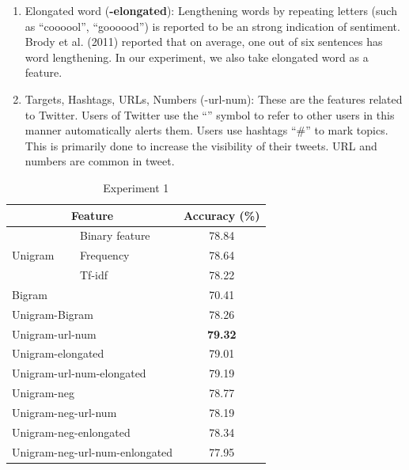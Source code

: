 \begin{itemize}
\begin{enumerate}
  	\item Elongated word (\textbf{-elongated}): Lengthening words by repeating letters (such as “coooool”, “goooood”) is reported to be an strong indication of sentiment. Brody et al. (2011) reported that on average, one out of six sentences has word lengthening. In our experiment, we also take elongated word as a feature. 
   \item Targets, Hashtags, URLs, Numbers (-url-num): These are the features related to Twitter. Users of Twitter use the “\@” symbol to refer to other users in this manner automatically alerts them. Users use hashtags “\#” to mark topics. This is primarily done to increase the visibility of their tweets. URL and numbers are common in tweet. 
  
\end{enumerate}


\begin{table}[H]
  \begin{center}
    \begin{tabular}{llc}\hline
     \multicolumn{2}{c}{Feature} & Accuracy (\%)     \\\hline
     \multirow{3}{*}{Unigram}    & Binary feature  &  78.84  \\ 
                                 & Frequency       &  78.64  \\ 
                                 & Tf-idf          &  78.22 \\
     \multicolumn{2}{l}{Bigram}                    &  70.41 \\  
     \multicolumn{2}{l}{Unigram-Bigram}            &  78.26 \\         
     \multicolumn{2}{l}{Unigram-url-num}           &  \textbf{79.32} \\
     \multicolumn{2}{l}{Unigram-elongated}         &  79.01 \\
     \multicolumn{2}{l}{Unigram-url-num-elongated} &  79.19 \\
     \multicolumn{2}{l}{Unigram-neg}               &  78.77 \\
     \multicolumn{2}{l}{Unigram-neg-url-num}       &  78.19 \\
     \multicolumn{2}{l}{Unigram-neg-enlongated}    &  78.34 \\
     \multicolumn{2}{l}{Unigram-neg-url-num-enlongated}  &  77.95 \\\hline      
    \end{tabular}
    \end{center}
    \caption{\label{exp5_1} Experiment 1}
\end{table}


\end{itemize}
